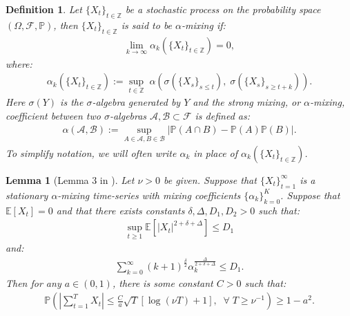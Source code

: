 \documentclass{article}
\newcommand{\sforall}{\;\forall\;}
\newcommand{\E}{\mathbb{E}}
\newtheorem{definition}{Definition}
\newtheorem{lemma}{Lemma}
\begin{document}
\begin{definition}\label{def:a-mixing}
Let $\{X_t\}_{t\in \mathbb{Z}}$ be a stochastic process on the probability space $(\Omega, \mathcal{F}, \mathbb{P})$, then $\{X_t\}_{t\in \mathbb{Z}}$ is said to be $\alpha$-mixing if:
\begin{align*}
    \lim_{k\to\infty} \alpha_k(\{X_t\}_{t\in\mathbb{Z}}) = 0,
\end{align*}
where:
\begin{align*}
    \alpha_k(\{X_t\}_{t\in\mathbb{Z}}) := \sup_{t\in\mathbb{Z}} \; \alpha\left(\sigma(\{X_s\}_{s \leq t}), \; \sigma(\{X_s\}_{s \geq t + k})\right).
\end{align*}
Here $\sigma(Y)$ is the $\sigma$-algebra generated by $Y$ and the strong mixing, or $\alpha$-mixing, coefficient between two $\sigma$-algebras $\mathcal{A}, \mathcal{B} \subset \mathcal{F}$ is defined as:
\begin{align*}
    \alpha(\mathcal{A}, \mathcal{B}) := \sup_{A\in\mathcal{A}, B\in\mathcal{B}} |\mathbb{P}(A \cap B) - \mathbb{P}(A)\mathbb{P}(B)|.
\end{align*}
To simplify notation, we will often write $\alpha_k$ in place of $\alpha_k(\{X_t\}_{t\in\mathbb{Z}})$.
\end{definition}

\begin{lemma}[Lemma 3 in \cite{Padilla23}]
Let $\nu > 0$ be given. Suppose that $\{X_t\}_{t=1}^\infty$ is a stationary $\alpha$-mixing time-series with mixing coefficients $\{\alpha_k\}_{k=0}^K$. Suppose that $\E[X_t] = 0$ and that there exists constants $\delta, \Delta, D_1, D_2 > 0$ such that:
\begin{align*}
    \sup_{t \geq 1} \E\left[\left|X_t\right|^{2+\delta+\Delta}\right] \leq D_1 
\end{align*}
and:
\begin{align*}
    \sum_{k=0}^\infty (k+1)^{\frac{\delta}{2}} \alpha_k^{\frac{\Delta}{2+\delta+\Delta}} \leq D_1.
\end{align*}
Then for any $a \in (0,1)$, there is some constant $C > 0$ such that:
\begin{align*}
    \mathbb{P} \left(\left|\sum_{t=1}^T X_t\right| \leq \frac{C}{a}\sqrt{T}\left[\log (\nu T) + 1\right], \;\sforall T \geq \nu^{-1}\right) 
    \geq 1 - a^2.
\end{align*}
\end{lemma}
\end{document}
